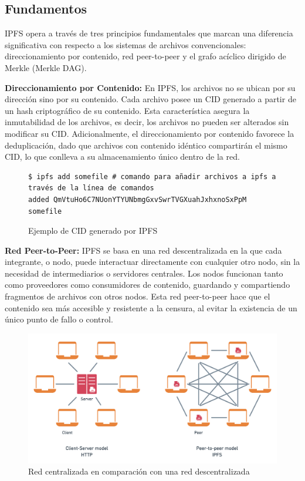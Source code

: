 \subsection{Fundamentos}\label{sect:fundamentos}
IPFS opera a través de tres principios fundamentales que marcan una diferencia significativa con respecto a los sistemas de archivos convencionales: direccionamiento por contenido, red peer-to-peer y el grafo acíclico dirigido de Merkle (Merkle DAG).


\textbf{Direccionamiento por Contenido:} En IPFS, los archivos no se ubican por su dirección sino por su contenido. Cada archivo posee un CID generado a partir de un hash criptográfico de su contenido. Esta característica
asegura la inmutabilidad de los archivos, es decir, los archivos no pueden ser alterados sin modificar su CID. Adicionalmente, el
direccionamiento por contenido favorece la deduplicación, dado que archivos con contenido idéntico compartirán el mismo CID, lo que conlleva a
su almacenamiento único dentro de la red.

\begin{figure}[H]
      \begin{verbatim}
$ ipfs add somefile # comando para añadir archivos a ipfs a través de la línea de comandos
added QmVtuHo6C7NUonYTYUNbmgGxvSwrTVGXuahJxhxnoSxPpM somefile
      \end{verbatim}
      \caption{Ejemplo de CID generado por IPFS}
      \label{fig:ipfs-add}
\end{figure}

\textbf{Red Peer-to-Peer:} IPFS se basa en una red descentralizada en la que cada integrante, o nodo, puede interactuar directamente con cualquier otro nodo, sin la necesidad de intermediarios o servidores centrales. Los nodos funcionan tanto como proveedores como consumidores de contenido, guardando y compartiendo fragmentos de archivos con otros nodos. Esta red peer-to-peer hace que el contenido sea más accesible y resistente a la censura, al evitar la existencia de un único punto de fallo o control.
\begin{figure}[H]
      \centering
      \includegraphics[width=\linewidth]{images/centralvsdecentral.png}
      \caption{Red centralizada en comparación con una red descentralizada}
      \label{fig:centralvsdecentral}
\end{figure}

